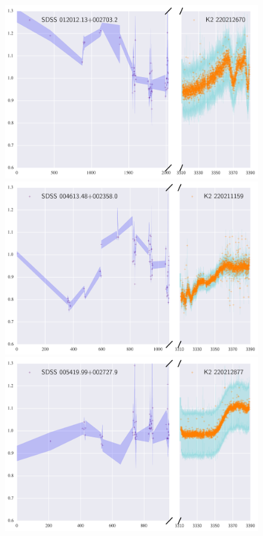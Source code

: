 \documentclass[a4paper,fleqn,usenatbib]{mnras}
\begin{document}
  
   \begin{figure}
 	\includegraphics[width=\columnwidth]{220212670ExtendedLC.png}
 	\includegraphics[width=\columnwidth]{220211159ExtendedLC.png}
 	\includegraphics[width=\columnwidth]{220212877ExtendedLC.png}
   	\caption{}
   	\label{fig:example_figure}
   \end{figure}
 
\end{document}

